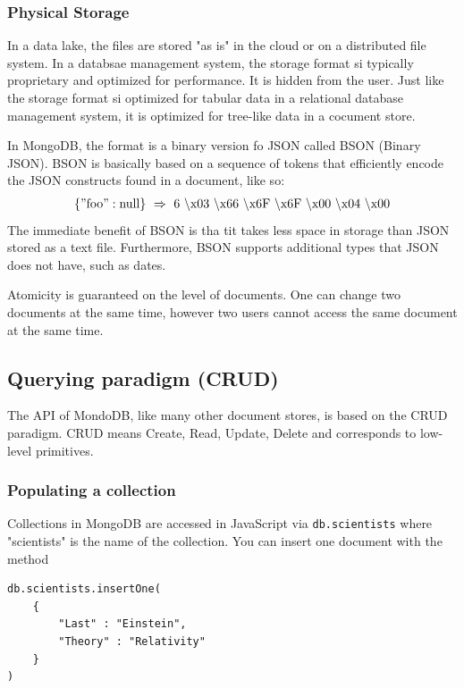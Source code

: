 \subsubsection{Physical Storage}

In a data lake, the files are stored "as is" in the cloud or on a distributed file system. In a databsae management system, the storage format si typically proprietary and optimized for performance. It is hidden from the user. Just like the storage format si optimized for tabular data in a relational database management system, it is optimized for tree-like data in a cocument store.

In MongoDB, the format is a binary version fo JSON called BSON (Binary JSON). BSON is basically based on a sequence of tokens that efficiently encode the JSON constructs found in a document, like so:
\begin{align*}
    \mathrm{ \geschwungeneklammer{"foo": null} \ \Rightarrow \ 6 \ \backslash x03 \ \backslash x66 \ \backslash x6F \ \backslash x6F \ \backslash x00 \ \backslash x04 \ \backslash x00 }
\end{align*}
The immediate benefit of BSON is tha tit takes less space in storage than JSON stored as a text file. Furthermore, BSON supports additional types that JSON does not have, such as dates.

Atomicity is guaranteed on the level of documents. One can change two documents at the same time, however two users cannot access the same document at the same time.


\subsection{Querying paradigm (CRUD)}

The API of MondoDB, like many other document stores, is based on the CRUD paradigm. CRUD means Create, Read, Update, Delete and corresponds to low-level primitives.

\subsubsection{Populating a collection}
Collections in MongoDB are accessed in JavaScript via \texttt{db.scientists} where "scientists" is the name of the collection. You can insert one document with the method
\begin{lstlisting}[style=neutral]
db.scientists.insertOne(
    {
        "Last" : "Einstein",
        "Theory" : "Relativity"
    }
)
\end{lstlisting}

